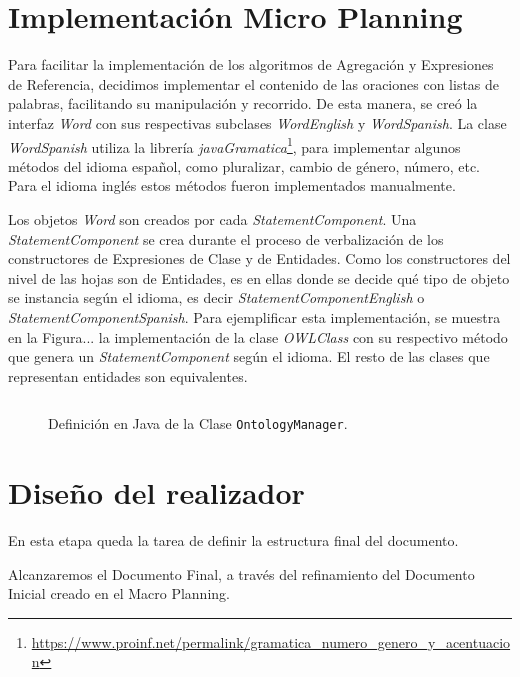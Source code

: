 \section{Implementación Micro Planning}
Para facilitar la implementación de los algoritmos de Agregación y Expresiones de Referencia, decidimos implementar el contenido de las oraciones con listas de palabras, facilitando su manipulación y recorrido. De esta manera, se creó la interfaz \emph{Word} con sus respectivas subclases \emph{WordEnglish} y \emph{WordSpanish}. 
La clase \emph{WordSpanish} utiliza la librería \emph{javaGramatica}\footnote{\url{https://www.proinf.net/permalink/gramatica_numero_genero_y_acentuacion}}, para implementar algunos métodos del idioma español, como pluralizar, cambio de género, número, etc. Para el idioma inglés estos métodos fueron implementados manualmente.

Los objetos \emph{Word} son creados por cada \emph{StatementComponent}. Una \emph{StatementComponent} se crea durante el proceso de verbalización de los constructores de Expresiones de Clase y de Entidades. Como los constructores del nivel de las hojas son de Entidades, es en ellas donde se decide qué tipo de objeto se instancia según el idioma, es decir \emph{StatementComponentEnglish} o \emph{StatementComponentSpanish}. Para ejemplificar esta implementación, se muestra en la Figura... la implementación de la clase \emph{OWLClass} con su respectivo método que genera un \emph{StatementComponent} según el idioma. El resto de las clases que representan entidades son equivalentes.



\begin{figure}
\begin{verbatim}

\end{verbatim}
\caption{Definición en Java de la Clase \texttt{OntologyManager}.}
\label{fig:clase_ontologymanager}
\end{figure}

\section{Diseño del realizador}
En esta etapa queda la tarea de definir la estructura final del documento. 

Alcanzaremos el Documento Final, a través del refinamiento del Documento Inicial creado en el Macro Planning.

